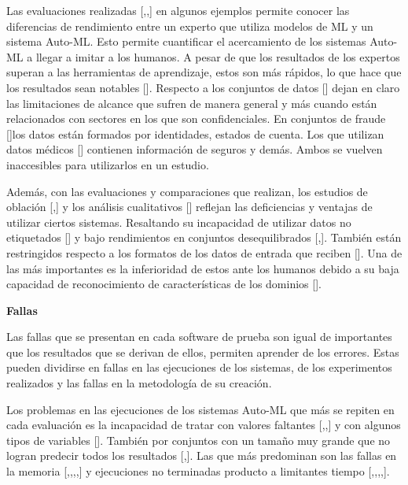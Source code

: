 Las evaluaciones realizadas [\cite{19},\cite{20},\cite{21}] en algunos ejemplos permite conocer las diferencias de rendimiento entre un experto que utiliza modelos de 
ML y un sistema Auto-ML. Esto permite cuantificar el acercamiento de los sistemas Auto-ML a llegar a imitar a los humanos. A pesar de que los resultados de los 
expertos superan a las herramientas de aprendizaje, estos son más rápidos, lo que hace que los resultados sean notables [\cite{22}]. Respecto a los conjuntos de datos 
[\cite{30}] dejan en claro las limitaciones de alcance que sufren de manera general y más cuando están relacionados con sectores en los que son confidenciales. 
En conjuntos de fraude [\cite{33}]los datos están formados por identidades, estados de cuenta. Los que utilizan datos médicos [\cite{33}] contienen 
información de seguros y demás. Ambos se vuelven inaccesibles para utilizarlos en un estudio.

Además, con las evaluaciones y comparaciones que realizan, los estudios de oblación [\cite{17},\cite{29}] y los análisis cualitativos [\cite{31}] reflejan las 
deficiencias y ventajas de utilizar ciertos sistemas. Resaltando su incapacidad de utilizar datos no etiquetados [\cite{26}] y bajo rendimientos en conjuntos 
desequilibrados [\cite{30},\cite{32}]. También están restringidos respecto a los formatos de los datos de entrada que reciben [\cite{27}]. Una de las más importantes 
es la inferioridad de estos ante los humanos debido a su baja capacidad de reconocimiento de características de los dominios [\cite{19}].

\begin{flushleft} 
    {\large { \textbf{Fallas}}}\label{subsection:fallas Auto-ML}
\end{flushleft}
Las fallas que se presentan en cada software de prueba son igual de importantes que los resultados que se derivan de ellos, permiten aprender de los errores. 
Estas pueden dividirse en fallas en las ejecuciones de los sistemas, de los experimentos realizados y las fallas en la metodología de su creación.

Los problemas en las ejecuciones de los sistemas Auto-ML que más se repiten en cada evaluación es la incapacidad de tratar con valores faltantes 
[\cite{10},\cite{22},\cite{32}] y con algunos tipos de variables [\cite{30}]. También por conjuntos con un tamaño muy grande que no logran predecir todos los resultados 
[\cite{12},\cite{22}]. Las que más predominan son las fallas en la memoria [\cite{10},\cite{11},\cite{12},\cite{22},\cite{29}] y ejecuciones no terminadas producto a limitantes 
tiempo [\cite{10},\cite{12},\cite{19},\cite{20},\cite{29}].

